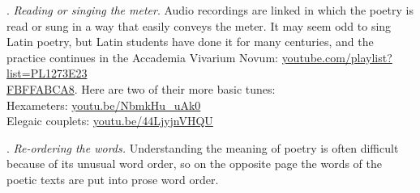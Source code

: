\documentclass[20pt, twoside]{extarticle}
\renewcommand\fbox{\fcolorbox{bordergray}{white}}
\newcommand{\ornament}[2]{%
	\setlength{\fboxrule}{0pt}
	\noindent
	\makebox[\textwidth]{\fbox{\texttt{[image: \_img/\#1]}}}
}
\begin{document}
\begin{singlespace}
\begin{en}
. \emph{Reading or singing the meter}. Audio recordings are linked in which the poetry is read or sung in a way that easily conveys the meter. It may seem odd to sing Latin poetry, but Latin students have done it for many centuries, and the practice continues in the Accademia Vivarium Novum: \href{https://www.youtube.com/playlist?list=PL1273E23FBFFABCA8}{youtube.com/playlist?list=PL1273E23\\FBFFABCA8}. Here are two of their more basic tunes:\\[.4\baselineskip]
Hexameters: \url{youtu.be/NbmkHu_uAk0}\\
Elegaic couplets: \url{youtu.be/44LjyjnVHQU}%

. \emph{Re-ordering the words.} Understanding the meaning of poetry is often difficult because of its unusual word order, so on the opposite page the words of the poetic texts are put into prose word order.\\



\end{en}
\end{singlespace}
\end{document}
